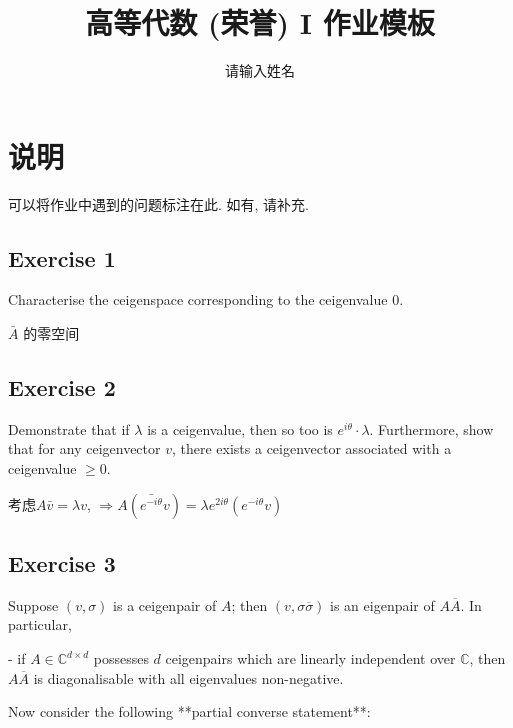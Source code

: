 \documentclass[11pt]{ctexart}
\title{高等代数 (荣誉) I 作业模板}
\author{请输入姓名}
\theoremstyle{definition}
\numberwithin{equation}{section}
\theoremstyle{definition}
\theoremstyle{remark}
\begin{document}
\maketitle

\section{说明}

可以将作业中遇到的问题标注在此. 如有, 请补充.

\tableofcontents

\newpage


\subsection{Exercise 1}
Characterise the ceigenspace corresponding to the ceigenvalue $0$.
\begin{aaa}
    $\bar{A}$ 的零空间
\end{aaa}
\subsection{Exercise 2}
Demonstrate that if $\lambda$ is a ceigenvalue, then so too is $e^{i \theta} \cdot \lambda$. Furthermore, show that for any ceigenvector $v$, there exists a ceigenvector associated with a ceigenvalue $\geq 0$.
\begin{aaa}
    考虑$A\bar{v}=\lambda v$, $\Rightarrow A(\bar{e^{-i\theta}}v)=\lambda e^{2i\theta}(e^{-i\theta}v)$
\end{aaa}
\subsection{Exercise 3}
Suppose $(v, \sigma)$ is a ceigenpair of $A$; then $(v, \sigma \overline \sigma)$ is an eigenpair of $A \overline A$. In particular,

- if $A \in \mathbb C^{d \times d}$ possesses $d$ ceigenpairs which are linearly independent over $\mathbb C$, then $A\overline A$ is diagonalisable with all eigenvalues non-negative.

Now consider the following **partial converse statement**:
\end{document}
